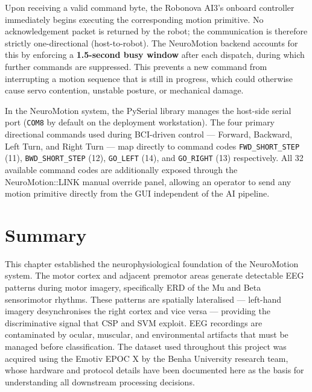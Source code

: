\documentclass[12pt, a4paper, oneside]{report}
\begin{document}
Upon receiving a valid command byte, the Robonova AI3's onboard controller
immediately begins executing the corresponding motion primitive. No
acknowledgement packet is returned by the robot; the communication is therefore
strictly one-directional (host-to-robot). The NeuroMotion backend accounts for
this by enforcing a \textbf{1.5-second busy window} after each dispatch, during
which further commands are suppressed. This prevents a new command from
interrupting a motion sequence that is still in progress, which could otherwise
cause servo contention, unstable posture, or mechanical damage.

In the NeuroMotion system, the PySerial library manages the host-side serial
port (\texttt{COM8} by default on the deployment workstation). The four primary
directional commands used during BCI-driven control --- Forward, Backward, Left
Turn, and Right Turn --- map directly to command codes \texttt{FWD\_SHORT\_STEP}
(11), \texttt{BWD\_SHORT\_STEP} (12), \texttt{GO\_LEFT} (14), and
\texttt{GO\_RIGHT} (13) respectively. All 32 available command codes are
additionally exposed through the NeuroMotion::LINK manual override panel,
allowing an operator to send any motion primitive directly from the GUI
independent of the AI pipeline.

\section{Summary}

This chapter established the neurophysiological foundation of the NeuroMotion
system. The motor cortex and adjacent premotor areas generate detectable EEG
patterns during motor imagery, specifically ERD of the Mu and Beta sensorimotor
rhythms. These patterns are spatially lateralised --- left-hand imagery
desynchronises the right cortex and vice versa --- providing the discriminative
signal that CSP and SVM exploit. EEG recordings are contaminated by ocular,
muscular, and environmental artifacts that must be managed before classification.
The dataset used throughout this project was acquired using the Emotiv EPOC X by
the Benha University research team, whose hardware and protocol details have been
documented here as the basis for understanding all downstream processing decisions.

\end{document}
